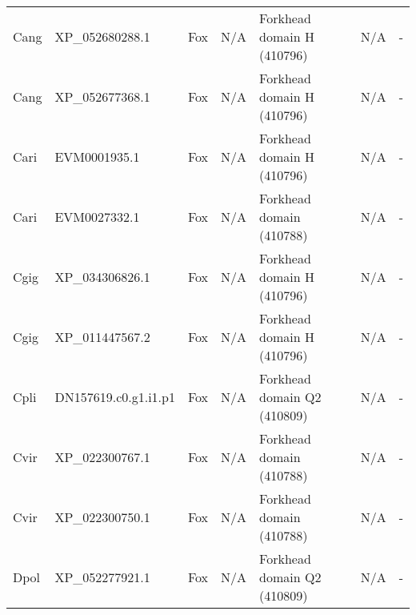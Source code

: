 \documentclass[../main.tex]{subfiles}
\begin{document}
\begin{landscape}
\begin{longtable}{lllllll}
		Cang           & XP\_052680288.1       & Fox            & N/A                 & Forkhead domain H (410796)                  & N/A                                                                    & -                    \\
		Cang           & XP\_052677368.1       & Fox            & N/A                 & Forkhead domain H (410796)                  & N/A                                                                    & -                    \\
		Cari           & EVM0001935.1          & Fox            & N/A                 & Forkhead domain H (410796)                  & N/A                                                                    & -                    \\
		Cari           & EVM0027332.1          & Fox            & N/A                 & Forkhead domain (410788)                    & N/A                                                                    & -                    \\
		Cgig           & XP\_034306826.1       & Fox            & N/A                 & Forkhead domain H (410796)                  & N/A                                                                    & -                    \\
		Cgig           & XP\_011447567.2       & Fox            & N/A                 & Forkhead domain H (410796)                  & N/A                                                                    & -                    \\
		Cpli           & DN157619.c0.g1.i1.p1  & Fox            & N/A                 & Forkhead domain Q2 (410809)                 & N/A                                                                    & -                    \\
		Cvir           & XP\_022300767.1       & Fox            & N/A                 & Forkhead domain (410788)                    & N/A                                                                    & -                    \\
		Cvir           & XP\_022300750.1       & Fox            & N/A                 & Forkhead domain (410788)                    & N/A                                                                    & -                    \\
		Dpol           & XP\_052277921.1       & Fox            & N/A                 & Forkhead domain Q2 (410809)                 & N/A                                                                    & -                    \\

\end{longtable}
\end{landscape}
\end{document}
